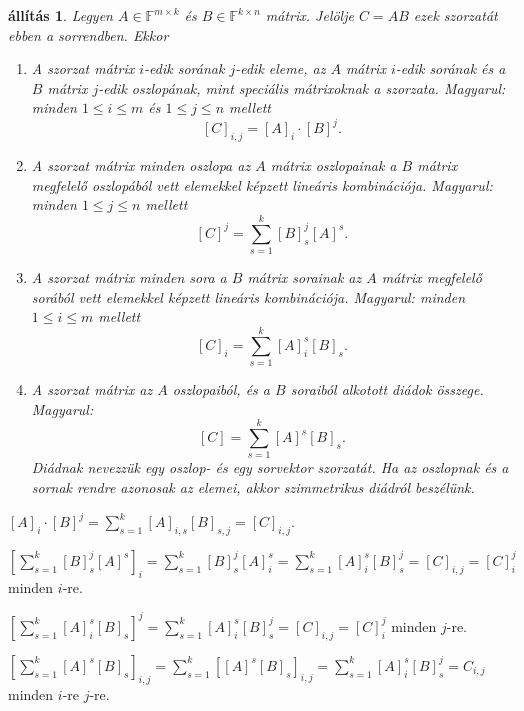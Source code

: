 \documentclass[a4paper, showtrims]{memoir}
\makeatletter
\renewenvironment{proof}[1][\proofname]
    {\par\pushQED{\qed}%
    \normalfont \topsep6\p@\@plus6\p@\relax
    \trivlist
    \item[\hskip\labelsep
        \itshape
    #1\@addpunct{:}]\ignorespaces}
    {\popQED\endtrivlist\@endpefalse}
\theoremstyle{plain}
\newtheorem{proposition}{állítás}[chapter]
\theoremstyle{remark}
\theoremstyle{definition}
\makeatother
\begin{document}
\begin{proposition}\label{pr:matrixmul}
	Legyen $A\in\mathbb{F}^{m\times k}$ és $B\in\mathbb{F}^{k\times n}$ mátrix.
	Jelölje $C=AB$ ezek szorzatát ebben a sorrendben.
	Ekkor
	\begin{enumerate}
		\item A szorzat mátrix $i$-edik sorának $j$-edik eleme,
		      az $A$ mátrix $i$-edik sorának és a $B$ mátrix $j$-edik
		      oszlopának, mint speciális mátrixoknak a szorzata.
		      Magyarul: minden $1\leq i\leq m$ és $1\leq j \leq n$ mellett
		      \[
			      [C]_{i,j}=[A]_i\cdot [B]^j.
		      \]
		\item
		      A szorzat mátrix minden oszlopa az $A$ mátrix oszlopainak a $B$ mátrix megfelelő oszlopából vett elemekkel képzett
		      lineáris kombinációja.
		      Magyarul: minden $1\leq j\leq n$ mellett
		      \[
			      [C]^j=\sum_{s=1}^k[B]_s^j[A]^s.
		      \]
		\item
		      A szorzat mátrix minden sora a $B$ mátrix sorainak az $A$ mátrix megfelelő sorából vett elemekkel képzett
		      lineáris kombinációja.
		      Magyarul: minden $1\leq i\leq m$ mellett
		      \[
			      [C]_i=\sum_{s=1}^k[A]_i^s[B]_s.
		      \]
		\item
		      A szorzat mátrix az $A$ oszlopaiból, és a $B$ soraiból alkotott diádok összege.
		      Magyarul:
		      \[
			      [C]=\sum_{s=1}^k[A]^s[B]_s.
		      \]
		      \emph{Diádnak} nevezzük egy oszlop- és egy sorvektor szorzatát.
		      Ha az oszlopnak és a sornak rendre azonosak az elemei, akkor
		      \emph{szimmetrikus diádról} beszélünk.
		      \qedhere
	\end{enumerate}
\end{proposition}
\begin{proof}[1. bizonyítása]
	$[A]_i\cdot [B]^j=\sum_{s=1}^k[A]_{i,s}[B]_{s,j}=[C]_{i,j}.$
\end{proof}
\begin{proof}[2. bizonyítása]
	\(
	\left[ \sum_{s=1}^k[B]_s^j[A]^s \right]_i=
	\sum_{s=1}^k[B]_s^j[A]_i^s =
	\sum_{s=1}^k[A]_i^s[B]_s^j =
	[C]_{i,j}=
		[C]_i^j
	\)
	minden $i$-re.
\end{proof}
\begin{proof}[3. bizonyítása]
	\(
	\left[ \sum_{s=1}^k[A]_i^s[B]_s \right]^j=
	\sum_{s=1}^k[A]_i^s[B]_s^j=
	[C]_{i,j}=
		[C]_i^j
	\)
	minden $j$-re.
\end{proof}
\begin{proof}[4. bizonyítása]
	\(
	\left[ \sum_{s=1}^k[A]^s[B]_s \right]_{i,j}=
	\sum_{s=1}^k\left[ [A]^s[B]_s \right]_{i,j}=
	\sum_{s=1}^k [A]_i^s[B]_s^j=
	C_{i,j}
	\)
	minden $i$-re $j$-re.
\end{proof}
\end{document}
